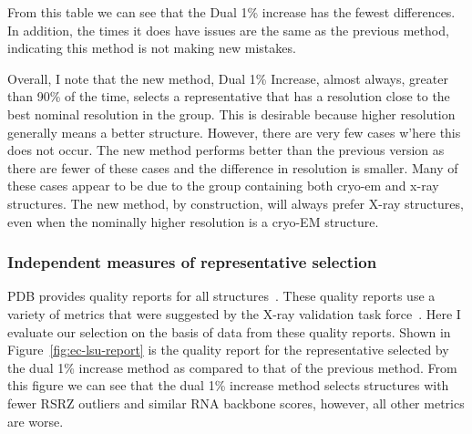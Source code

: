 From this table we can see that the Dual 1\% increase has the fewest differences.
In addition, the times it does have issues are the same as the previous method,
indicating this method is not making new mistakes.

Overall, I note that the new method, Dual 1\% Increase, almost always, greater
than 90\% of the time, selects a representative that has a resolution close to
the best nominal resolution in the group. This is desirable because higher
resolution generally means a better structure. However, there are very few cases
w’here this does not occur. The new method performs better than the previous
version as there are fewer of these cases and the difference in resolution is
smaller. Many of these cases appear to be due to the group containing both
cryo-em and x-ray structures. The new method, by construction, will always
prefer X-ray structures, even when the nominally higher resolution is a cryo-EM
structure.

\subsubsection{Independent measures of representative selection}

PDB provides quality reports for all structures~\cite{Gore2012}. These quality
reports use a variety of metrics that were suggested by the X-ray validation
task force~\cite{Gore2012}. Here I evaluate our selection on the basis of data
from these quality reports. Shown in Figure~\ref{fig:ec-lsu-report} is the
quality report for the representative selected by the dual 1\% increase method
as compared to that of the previous method. From this figure we can see that the
dual 1\% increase method selects structures with fewer RSRZ outliers and similar
RNA backbone scores, however, all other metrics are worse.

